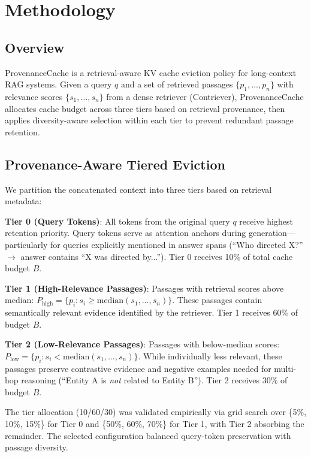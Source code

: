 \section{Methodology}

\subsection{Overview}

ProvenanceCache is a retrieval-aware KV cache eviction policy for long-context RAG systems. Given a query $q$ and a set of retrieved passages $\{p_1, \ldots, p_n\}$ with relevance scores $\{s_1, \ldots, s_n\}$ from a dense retriever (Contriever), ProvenanceCache allocates cache budget across three tiers based on retrieval provenance, then applies diversity-aware selection within each tier to prevent redundant passage retention.

\subsection{Provenance-Aware Tiered Eviction}

We partition the concatenated context into three tiers based on retrieval metadata:

\textbf{Tier 0 (Query Tokens)}: All tokens from the original query $q$ receive highest retention priority. Query tokens serve as attention anchors during generation—particularly for queries explicitly mentioned in answer spans (``Who directed X?'' $\rightarrow$ answer contains ``X was directed by...''). Tier 0 receives 10\% of total cache budget $B$.

\textbf{Tier 1 (High-Relevance Passages)}: Passages with retrieval scores above median: $P_{\text{high}} = \{p_i : s_i \geq \text{median}(s_1, \ldots, s_n)\}$. These passages contain semantically relevant evidence identified by the retriever. Tier 1 receives 60\% of budget $B$.

\textbf{Tier 2 (Low-Relevance Passages)}: Passages with below-median scores: $P_{\text{low}} = \{p_i : s_i < \text{median}(s_1, \ldots, s_n)\}$. While individually less relevant, these passages preserve contrastive evidence and negative examples needed for multi-hop reasoning (``Entity A is \textit{not} related to Entity B''). Tier 2 receives 30\% of budget $B$.

The tier allocation (10/60/30) was validated empirically via grid search over \{5\%, 10\%, 15\%\} for Tier 0 and \{50\%, 60\%, 70\%\} for Tier 1, with Tier 2 absorbing the remainder. The selected configuration balanced query-token preservation with passage diversity.

